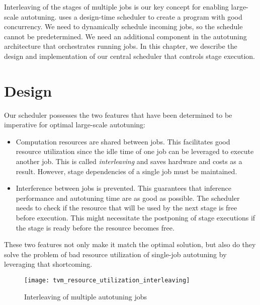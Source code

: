 Interleaving of the stages of multiple jobs is our key concept for enabling large-scale autotuning. \cite{Ma.2005} uses a design-time scheduler to create a program with good concurrency. We need to dynamically schedule incoming jobs, so the schedule cannot be predetermined. We need an additional component in the autotuning architecture that orchestrates running jobs. In this chapter, we describe the design and implementation of our central scheduler that controls stage execution.

\section{Design}
Our scheduler possesses the two features that have been determined to be imperative for optimal large-scale autotuning:
\begin{itemize}
	\item Computation resources are shared between jobs. This facilitates good resource utilization since the idle time of one job can be leveraged to execute another job. This is called \textit{interleaving} and saves hardware and costs as a result. However, stage dependencies of a single job must be maintained.
	\item Interference between jobs is prevented. This guarantees that inference performance and autotuning time are as good as possible. The scheduler needs to check if the resource that will be used by the next stage is free before execution. This might necessitate the postponing of stage executions if the stage is ready before the resource becomes free.
\end{itemize}
These two features not only make it match the optimal solution, but also do they solve the problem of bad resource utilization of single-job autotuning by leveraging that shortcoming.

\begin{figure}[h]
	\centering
	\texttt{[image: tvm\_resource\_utilization\_interleaving]}%
	\caption{Interleaving of multiple autotuning jobs}
	\label{fig:interleaving}
\end{figure}

